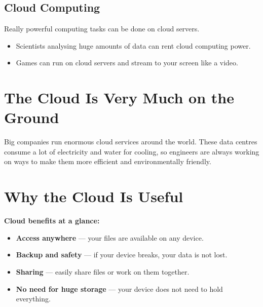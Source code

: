 \subsection*{Cloud Computing}

Really powerful computing tasks can be done on cloud servers.

\begin{itemize}
  \item Scientists analysing huge amounts of data can rent cloud computing power.
  \item Games can run on cloud servers and stream to your screen like a video.
\end{itemize}

\sectionrule

\section*{The Cloud Is Very Much on the Ground}


Big companies run enormous cloud services around the world.
These data centres consume a lot of electricity and water for cooling,
so engineers are always working on ways to make them more efficient and environmentally friendly.

\sectionrule

\section*{Why the Cloud Is Useful}

\begin{quickmap}
  \textbf{Cloud benefits at a glance:}
  \begin{itemize}
    \item \textbf{Access anywhere} — your files are available on any device.
    \item \textbf{Backup and safety} — if your device breaks, your data is not lost.
    \item \textbf{Sharing} — easily share files or work on them together.
    \item \textbf{No need for huge storage} — your device does not need to hold everything.
  \end{itemize}
\end{quickmap}

